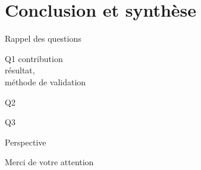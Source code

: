 \section{Conclusion et synthèse}
\begin{frame}{Rappel des questions}
\end{frame}

\begin{frame}{Q1}
 contribution\\
résultat, \\
méthode de validation   
\end{frame}

\begin{frame}{Q2}
\end{frame}

\begin{frame}{Q3}
    
\end{frame}

\begin{frame}{Perspective}
    
\end{frame}

\begin{frame}[plain]
    Merci de votre attention
\end{frame}